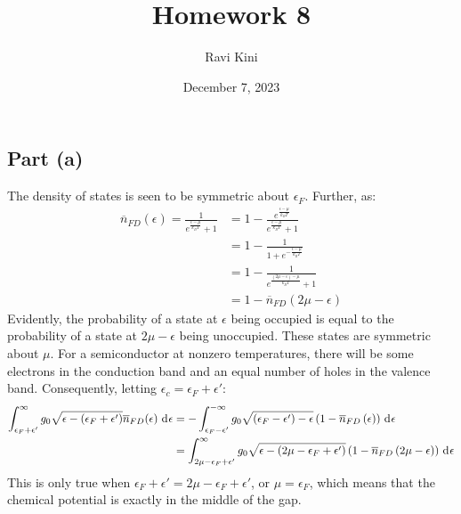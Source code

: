 \documentclass{article}
\title{Homework 8}
\author{Ravi Kini}
\date{December 7, 2023}
\begin{document}
\maketitle

\subsection*{Part (a)}
The density of states is seen to be symmetric about $\epsilon_F$. Further, as:
\begin{equation}
    \begin{split}
        \overline{n}_{FD}\left(\epsilon\right) = \frac{1}{e^{\frac{\epsilon - \mu}{k_BT}} + 1} & = 1 - \frac{e^{\frac{\epsilon - \mu}{k_BT}}}{e^{\frac{\epsilon - \mu}{k_BT}} + 1} \\
        & = 1 - \frac{1}{1 + e^{-\frac{\epsilon - \mu}{k_BT}}} \\
        & = 1 - \frac{1}{e^{\frac{(2\mu-\epsilon) - \mu}{k_BT}} + 1} \\
        & = 1 - \overline{n}_{FD}(2\mu - \epsilon)
    \end{split}
\end{equation}
Evidently, the probability of a state at $\epsilon$ being occupied is equal to the probability of a state at $2\mu - \epsilon$ being unoccupied. These states are symmetric about $\mu$. For a semiconductor at nonzero temperatures, there will be some electrons in the conduction band and an equal number of holes in the valence band. Consequently, letting $\epsilon_c = \epsilon_F + \epsilon'$:
\begin{equation}
    \begin{split}
        \int_{\epsilon_F + \epsilon'}^{\infty} g_0\sqrt{\epsilon - \left(\epsilon_F + \epsilon'\right)}\overline{n}_{FD}(\epsilon) \, \diff{\epsilon} & = -\int_{\epsilon_F - \epsilon'}^{-\infty} g_0\sqrt{\left(\epsilon_F - \epsilon'\right) - \epsilon}\left(1 - \overline{n}_{FD}\left(\epsilon\right)\right) \, \diff{\epsilon} \\
        & = \int_{2\mu - \epsilon_F + \epsilon'}^{\infty} g_0\sqrt{\epsilon - \left(2\mu - \epsilon_F + \epsilon'\right)}\left(1 - \overline{n}_{FD}\left(2\mu - \epsilon\right)\right) \, \diff{\epsilon}
    \end{split}
\end{equation}
This is only true when $\epsilon_F + \epsilon' = 2\mu - \epsilon_F + \epsilon'$, or $\mu = \epsilon_F$, which means that the chemical potential is exactly in the middle of the gap.
\end{document}

